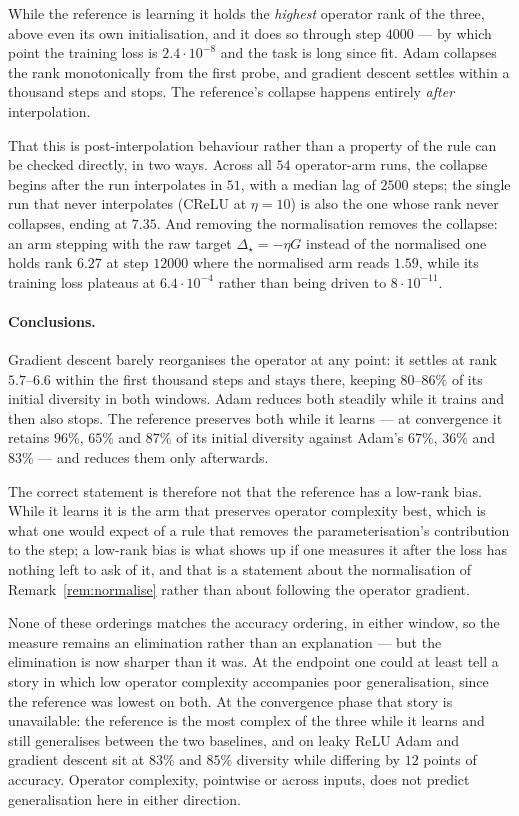 \documentclass{article} %
\theoremstyle{plain}
\theoremstyle{definition}
\theoremstyle{remark}
\begin{document}
\noindent While the reference is learning it holds the \emph{highest} operator rank of the three,
above even its own initialisation, and it does so through step $4000$ --- by which point the
training loss is $2.4\cdot10^{-8}$ and the task is long since fit. Adam collapses the rank
monotonically from the first probe, and gradient descent settles within a thousand steps and stops.
The reference's collapse happens entirely \emph{after} interpolation.

That this is post-interpolation behaviour rather than a property of the rule can be checked
directly, in two ways. Across all $54$ operator-arm runs, the collapse begins after the run
interpolates in $51$, with a median lag of $2500$ steps; the single run that never interpolates
(CReLU at $\eta = 10$) is also the one whose rank never collapses, ending at $7.35$. And removing
the normalisation removes the collapse: an arm stepping with the raw target $\Delta_\star = -\eta G$
instead of the normalised one holds rank $6.27$ at step $12000$ where the normalised arm reads
$1.59$, while its training loss plateaus at $6.4\cdot10^{-4}$ rather than being driven to
$8\cdot10^{-11}$.

\paragraph{Conclusions.}
Gradient descent barely reorganises the operator at any point: it settles at rank $5.7$--$6.6$
within the first thousand steps and stays there, keeping $80$--$86\%$ of its initial diversity in
both windows. Adam reduces both steadily while it trains and then also stops. The reference
preserves both while it learns --- at convergence it retains $96\%$, $65\%$ and $87\%$ of its
initial diversity against Adam's $67\%$, $36\%$ and $83\%$ --- and reduces them only afterwards.

The correct statement is therefore not that the reference has a low-rank bias. While it learns it
is the arm that preserves operator complexity best, which is what one would expect of a rule that
removes the parameterisation's contribution to the step; a low-rank bias is what shows up if one
measures it after the loss has nothing left to ask of it, and that is a statement about the
normalisation of Remark~\ref{rem:normalise} rather than about following the operator gradient.

None of these orderings matches the accuracy ordering, in either window, so the measure remains an
elimination rather than an explanation --- but the elimination is now sharper than it was. At the
endpoint one could at least tell a story in which low operator complexity accompanies poor
generalisation, since the reference was lowest on both. At the convergence phase that story is
unavailable: the reference is the most complex of the three while it learns and still generalises
between the two baselines, and on leaky ReLU Adam and gradient descent sit at $83\%$ and $85\%$
diversity while differing by $12$ points of accuracy. Operator complexity, pointwise or across
inputs, does not predict generalisation here in either direction.
\end{document}
